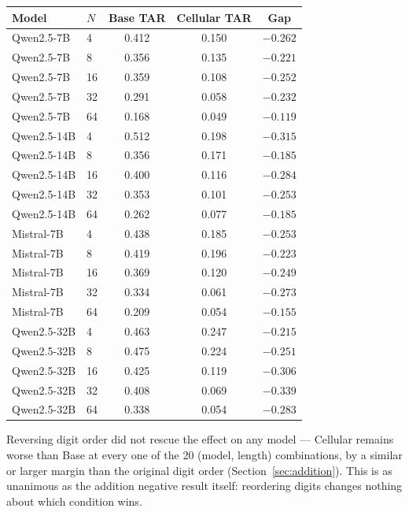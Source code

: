 \documentclass[11pt]{article}
\begin{document}
\begin{center}
\begin{tabular}{@{}llccc@{}}
\toprule
Model & $N$ & Base TAR & Cellular TAR & Gap \\
\midrule
Qwen2.5-7B & 4 & 0.412 & 0.150 & $-0.262$ \\
Qwen2.5-7B & 8 & 0.356 & 0.135 & $-0.221$ \\
Qwen2.5-7B & 16 & 0.359 & 0.108 & $-0.252$ \\
Qwen2.5-7B & 32 & 0.291 & 0.058 & $-0.232$ \\
Qwen2.5-7B & 64 & 0.168 & 0.049 & $-0.119$ \\
Qwen2.5-14B & 4 & 0.512 & 0.198 & $-0.315$ \\
Qwen2.5-14B & 8 & 0.356 & 0.171 & $-0.185$ \\
Qwen2.5-14B & 16 & 0.400 & 0.116 & $-0.284$ \\
Qwen2.5-14B & 32 & 0.353 & 0.101 & $-0.253$ \\
Qwen2.5-14B & 64 & 0.262 & 0.077 & $-0.185$ \\
Mistral-7B & 4 & 0.438 & 0.185 & $-0.253$ \\
Mistral-7B & 8 & 0.419 & 0.196 & $-0.223$ \\
Mistral-7B & 16 & 0.369 & 0.120 & $-0.249$ \\
Mistral-7B & 32 & 0.334 & 0.061 & $-0.273$ \\
Mistral-7B & 64 & 0.209 & 0.054 & $-0.155$ \\
Qwen2.5-32B & 4 & 0.463 & 0.247 & $-0.215$ \\
Qwen2.5-32B & 8 & 0.475 & 0.224 & $-0.251$ \\
Qwen2.5-32B & 16 & 0.425 & 0.119 & $-0.306$ \\
Qwen2.5-32B & 32 & 0.408 & 0.069 & $-0.339$ \\
Qwen2.5-32B & 64 & 0.338 & 0.054 & $-0.283$ \\
\bottomrule
\end{tabular}
\end{center}

Reversing digit order did not rescue the effect on any model --- Cellular remains worse than Base at every one of the 20 (model, length) combinations, by a similar or larger margin than the original digit order (Section~\ref{sec:addition}). This is as unanimous as the addition negative result itself: reordering digits changes nothing about which condition wins.
\end{document}
